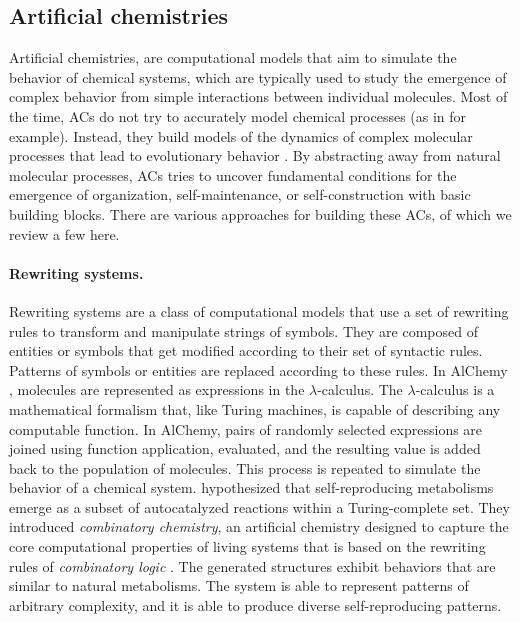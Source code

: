 \subsection{Artificial chemistries}
Artificial chemistries, are computational models that aim to simulate the
behavior of chemical systems, which are typically used to study the emergence of
complex behavior from simple interactions between individual molecules. Most of
the time, \acp{AC} do not try to accurately model chemical processes (as in
\parencite{ostrovskyCellularAutomataPolymer2001,
  buligaChemlambdaUniversalitySelfmultiplication2014,
  bedauLessAbstractArtificial2000, sayamaSeekingOpenendedEvolution2011} for
example). Instead, they build models of the dynamics of complex molecular
processes that lead to evolutionary behavior
\parencite{dittrichArtificialChemistriesReview2001}. By abstracting away from natural molecular processes, \acp{AC} tries to uncover fundamental
conditions for the emergence of organization, self-maintenance, or
self-construction with basic building blocks. There are various approaches for
building these \aclp{AC}, of which we review a few here.

\paragraph{Rewriting systems.}
Rewriting systems are a class of computational models that use a set of
rewriting rules to transform and manipulate strings of symbols. They are
composed of entities or symbols that get modified according to their set of
syntactic rules. Patterns of symbols or entities are replaced according to these
rules. In AlChemy \parencite{fontanaWhatWouldBe1994}, molecules are represented
as expressions in the $\lambda$-calculus. The $\lambda$-calculus is a mathematical formalism
that, like Turing machines, is capable of describing any computable function. In
AlChemy, pairs of randomly selected expressions are joined using function
application, evaluated, and the resulting value is added back to the population
of molecules. This process is repeated to simulate the behavior of a chemical
system. \textcite{kruszewskiEmergenceSelfReproducingMetabolisms2022}
hypothesized that self-reproducing metabolisms emerge as a subset of
autocatalyzed reactions within a Turing-complete set. They introduced
\emph{combinatory chemistry}, an artificial chemistry designed to capture the
core computational properties of living systems that is based on the rewriting
rules of \emph{combinatory logic} \parencite{curryCombinatoryLogic1958,
  schoenfinkelUeberBausteineMathematischen1924}. The generated structures
exhibit behaviors that are similar to natural metabolisms. The system is able to
represent patterns of arbitrary complexity, and it is able to produce diverse
self-reproducing patterns.

